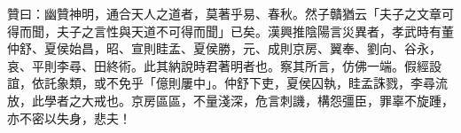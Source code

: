 \begin{pinyinscope}
贊曰：幽贊神明，通合天人之道者，莫著乎易、春秋。然子贛猶云「夫子之文章可得而聞，夫子之言性與天道不可得而聞」已矣。漢興推陰陽言災異者，孝武時有董仲舒、夏侯始昌，昭、宣則眭孟、夏侯勝，元、成則京房、翼奉、劉向、谷永，哀、平則李尋、田終術。此其納說時君著明者也。察其所言，仿佛一端。假經設誼，依託象類，或不免乎「億則屢中」。仲舒下吏，夏侯囚執，眭孟誅戮，李尋流放，此學者之大戒也。京房區區，不量淺深，危言刺譏，構怨彊臣，罪辜不旋踵，亦不密以失身，悲夫！


\end{pinyinscope}
